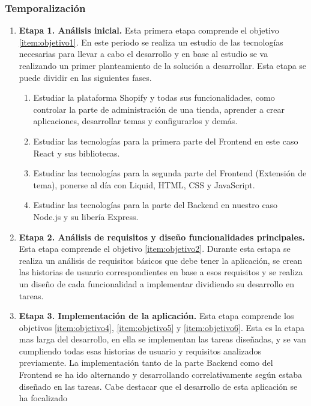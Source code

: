 \documentclass[12pt]{article}
\begin{document}
\subsubsection{Temporalización}

\begin{enumerate}[label={\textbf{\textbullet}}]
    \item \textbf{Etapa 1. Análisis inicial.} Esta primera etapa comprende el objetivo \ref{item:objetivo1}. En este periodo se realiza un estudio de las tecnologías
    necesarias para llevar a cabo el desarrollo y en base al estudio se va realizando un primer planteamiento de la solución a desarrollar. Esta etapa se puede dividir en las siguientes fases.
    \begin{enumerate}
        \item Estudiar la plataforma Shopify y todas sus funcionalidades, como controlar la parte de administración de una tienda, aprender a crear aplicaciones, desarrollar temas y configurarlos y demás.
        \item Estudiar las tecnologías para la primera parte del Frontend en este caso React y sus bibliotecas.
        \item Estudiar las tecnologías para la segunda parte del Frontend (Extensión de tema), ponerse al día con Liquid, HTML, CSS y JavaScript.
        \item Estudiar las tecnologías para la parte del Backend en nuestro caso Node.js y su libería Express. 
    \end{enumerate}
    \item \textbf{Etapa 2. Análisis de requisitos y diseño funcionalidades principales.} Esta etapa comprende el objetivo \ref{item:objetivo2}.
    Durante esta estapa se realiza un análisis de requisitos básicos que debe tener la aplicación, se crean las historias de usuario correspondientes en base a esos requisitos y se realiza un diseño de cada
    funcionalidad a implementar dividiendo su desarrollo en tareas.
    \item \textbf{Etapa 3. Implementación de la aplicación.} Esta etapa comprende los objetivos \ref{item:objetivo4}, \ref{item:objetivo5} y \ref{item:objetivo6}.
    Esta es la etapa mas larga del desarrollo, en ella se implementan las tareas diseñadas, y se van cumpliendo todas esas historias de usuario y requisitos analizados previamente.
    La implementación tanto de la parte Backend como del Frontend se ha ido alternando y desarrollando correlativamente según estaba diseñado en las tareas. Cabe destacar que el desarrollo de esta aplicación se ha focalizado

\end{enumerate}
\end{document}
